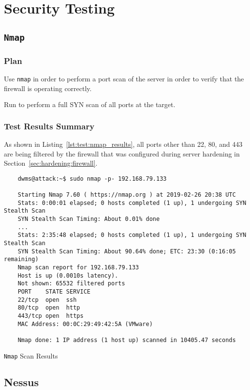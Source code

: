 \section{Security Testing}
\subsection{\texttt{Nmap}}
\subsubsection*{Plan}
Use \texttt{nmap} in order to perform a port scan of the server in order to verify that the firewall is operating correctly.

\noindent Run  to perform a full SYN scan of all ports at the target.

\subsubsection*{Test Results Summary}
As shown in Listing~\ref{lst:test:nmap_results}, all ports other than 22, 80, and 443 are being filtered by the firewall that was configured during server hardening in Section~\ref{sec:hardening:firewall}.
\begin{listing}[H]
  \captionsetup{skip=\skiplistingcaptionlen}
  \begin{verbatim}
    dwms@attack:~$ sudo nmap -p- 192.168.79.133

    Starting Nmap 7.60 ( https://nmap.org ) at 2019-02-26 20:38 UTC
    Stats: 0:00:01 elapsed; 0 hosts completed (1 up), 1 undergoing SYN Stealth Scan
    SYN Stealth Scan Timing: About 0.01% done
    ...
    Stats: 2:35:48 elapsed; 0 hosts completed (1 up), 1 undergoing SYN Stealth Scan
    SYN Stealth Scan Timing: About 90.64% done; ETC: 23:30 (0:16:05 remaining)
    Nmap scan report for 192.168.79.133
    Host is up (0.0010s latency).
    Not shown: 65532 filtered ports
    PORT    STATE SERVICE
    22/tcp  open  ssh
    80/tcp  open  http
    443/tcp open  https
    MAC Address: 00:0C:29:49:42:5A (VMware)

    Nmap done: 1 IP address (1 host up) scanned in 10405.47 seconds
  \end{verbatim}
  \caption{\texttt{Nmap} Scan Results}
  \label{lst:test:nmap_results}
\end{listing}

\pagebreak
\subsection{Nessus}

